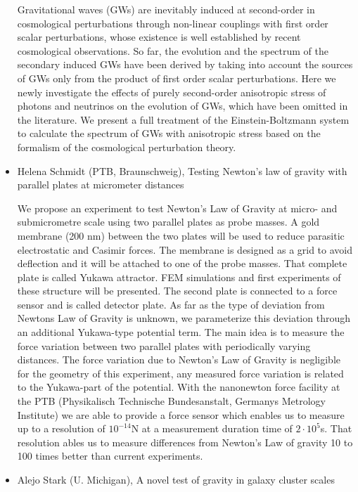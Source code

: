 \documentclass[letterpaper,12pt]{article}
\newcommand{\talk}[2]{{\fontspec{Lato Bold} #1,} {\fontspec{Lato Light Italic} #2}}
\begin{document}
\begin{itemize}
Gravitational waves (GWs) are inevitably induced at second-order in cosmological perturbations through non-linear couplings with first order scalar perturbations, whose existence is well established by recent cosmological observations. So far, the evolution and the spectrum of the secondary induced GWs have been derived by taking into account the sources of GWs only from the product of first order scalar perturbations. Here we newly investigate the effects of purely second-order anisotropic stress of photons and neutrinos on the evolution of GWs, which have been omitted in the literature. We present a full treatment of the Einstein-Boltzmann system to calculate the spectrum of GWs with anisotropic stress based on the formalism of the cosmological perturbation theory.

\item \talk{Helena Schmidt (PTB, Braunschweig)}{Testing Newton's law of gravity with parallel plates at micrometer distances}

We propose an experiment to test Newton's Law of Gravity at micro- and submicrometre scale using two parallel plates as probe masses. A gold membrane (200 nm) between the two plates will be used to reduce parasitic electrostatic and Casimir forces. The membrane is designed as a grid to avoid deflection and it will be attached to one of the probe masses. That complete plate is called Yukawa attractor. FEM simulations and first experiments of these structure will be presented. The second plate is connected to a force sensor and is called detector plate. As far as the type of deviation from Newtons Law of Gravity is unknown, we parameterize this deviation through an additional Yukawa-type potential term. The main idea is to measure the force variation between two parallel plates with periodically varying distances. The force variation due to Newton's Law of Gravity is negligible for the geometry of this experiment, any measured force variation is related to the Yukawa-part of the potential. With the nanonewton force facility at the PTB (Physikalisch Technische Bundesanstalt, Germanys Metrology Institute) we are able to provide a force sensor which enables us to measure up to a resolution of $10^{-14}$N at a measurement duration time of $2·10^5$s. That resolution ables us to measure differences from Newton's Law of gravity 10 to 100 times better than current experiments.

\item \talk{Alejo Stark (U. Michigan)}{A novel test of gravity in galaxy cluster scales}


\end{itemize}
\end{document}
